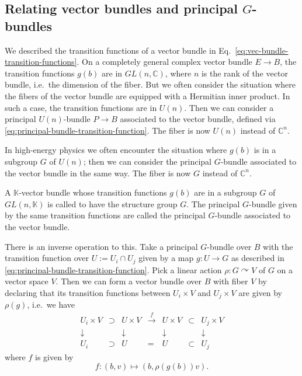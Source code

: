 \documentclass[12pt]{article}
\numberwithin{equation}{section}
\theoremstyle{remark}
\def\bC{\mathbb{C}}
\def\bK{\mathbb{K}}
\begin{document}
\subsection{Relating vector bundles and principal $G$-bundles}

We described the transition functions of a vector bundle in Eq.~\eqref{eq:vec-bundle-transition-functions}.
On a completely general complex vector bundle $E\to B$,
the transition functions $g (b)$ are in $GL(n,\bC)$,
where $n$ is the rank of the vector bundle, i.e.~the dimension of the fiber. 
But we often consider the situation where the fibers of the vector bundle are equipped with a Hermitian inner product.
In such a case, the transition functions are in $U(n)$.
Then we can consider a principal $U(n)$-bundle $P\to B$ associated to the vector bundle, 
defined via \eqref{eq:principal-bundle-transition-function}.
The fiber is now $U(n)$ instead of $\bC^n$.

In high-energy physics we often encounter the situation where $g (b)$ is in a subgroup $G$ of $U(n)$;
then we can consider the principal $G$-bundle associated to the vector bundle in the same way.
The fiber is now $G$ instead of $\bC^n$.

\begin{definition}
  A $\bK$-vector bundle whose transition functions $g(b)$ are in a subgroup $G$ of $GL(n,\bK)$
  is called to have the structure group $G$.
  The principal $G$-bundle given by the same transition functions are called 
  the  principal $G$-bundle associated to the vector bundle.
\end{definition}

There is an inverse operation to this.
Take a principal $G$-bundle over $B$
with the transition function over $U:=U_i\cap U_j$ given by
a map $g: U\to G$ as described in \eqref{eq:principal-bundle-transition-function}.
Pick a linear action $\rho: G \curvearrowright V$ of $G$ on a vector space $V$.
Then we can form a vector bundle over $B$ with fiber $V$
by declaring that its transition functions 
between $U_i\times V$ and $U_j\times V$
are given by $\rho(g)$, i.e.~we have
\begin{equation}
  \begin{array}{cccccccc}
    U_i \times V &\supset& U \times V & \xrightarrow{f } & 
    U \times V & \subset & U_j\times V \\
    \downarrow & & \downarrow & & \downarrow & & \downarrow \\
    U_i & \supset & U  & = & U  & \subset & U_j
  \end{array}
\end{equation}
where $f $ is given by \begin{equation}
   f : (b,v) \mapsto (b, \rho(g (b)) v).
\end{equation}
\end{document}
